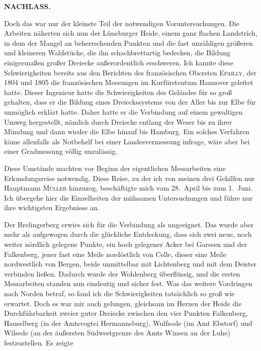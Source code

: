 \noindent{}\hfill{\small\textbf{NACHLASS.}}\hfill\null\par\medskip
\par\noindent\hspace*{\parindent}Doch das war nur der kleinste Teil der notwendigen Voruntersuchungen.
Die Arbeiten näherten sich nun der Lüneburger Heide, einem ganz flachen
Landstrich, in dem der Mangel an beherrschenden Punkten und die fast
unzähligen größeren und kleineren Waldstücke, die ihn schachbrettartig bedecken,
die Bildung einigermaßen großer Dreiecke außerordentlich erschweren. Ich
kannte diese Schwierigkeiten bereits aus den Berichten des französischen
Obersten \textsc{Epailly}, der 1804 und 1805 die französischen Messungen im
Kurfürstentum Hannover geleitet hatte. Dieser Ingenieur hatte die
Schwierigkeiten des Geländes für so groß gehalten, dass er die Bildung eines
Dreieckssystems von der Aller bis zur Elbe für unmöglich erklärt hatte. Daher
hatte er die Verbindung auf einem gewaltigen Umweg hergestellt, nämlich
durch Dreiecke entlang der Weser bis zu ihrer Mündung und dann wieder
die Elbe hinauf bis Hamburg. Ein solches Verfahren käme allenfalls als
Notbehelf bei einer Landesvermessung infrage, wäre aber bei einer
Gradmessung völlig unzulässig.

\par\noindent\hspace*{\parindent}Diese Umstände machten vor Beginn der eigentlichen Messarbeiten
eine Erkundungsreise notwendig. Diese Reise, zu der ich von meinen drei
Gehilfen nur Hauptmann \textsc{Müller} hinzuzog, beschäftigte mich vom
28.~April bis zum 1.~Juni. Ich übergehe hier die Einzelheiten der mühsamen
Untersuchungen und führe nur ihre wichtigsten Ergebnisse an.

\par\noindent\hspace*{\parindent}Der Brelingerberg erwies sich für die Verbindung als ungeeignet. Das
wurde aber mehr als aufgewogen durch die glückliche Entdeckung, dass sich
zwei neue, noch weiter nördlich gelegene Punkte, ein hoch gelegener Acker
bei Garssen und der Falkenberg, jener fast eine Meile nordöstlich von Celle,
dieser eine Meile nordwestlich von Bergen, beide unmittelbar mit Lichtenberg
und mit dem Deister verbinden ließen. Dadurch wurde der Wohlenberg
überflüssig, und die ersten Messarbeiten standen nun eindeutig und sicher
fest. Was das weitere Vordringen nach Norden betraf, so fand ich die
Schwierigkeiten tatsächlich so groß wie erwartet. Doch es war mir auch
gelungen, gleichsam im Herzen der Heide die Durchführbarkeit zweier guter
Dreiecke zwischen den vier Punkten Falkenberg, Hauselberg (in der Amtsvogtei
Hermannsburg), Wulfsode (im Amt Ebstorf) und Wilsede (an der äußersten
Südwestgrenze des Amts Winsen an der Luhe) festzustellen. Es zeigte
